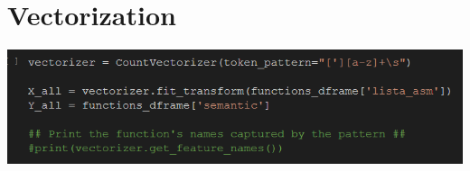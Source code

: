 \documentclass[11pt]{scrartcl}
\begin{document}
\newpage
\section{Vectorization}

\vspace{0.4cm}
\hspace{+0.2in}\includegraphics[width=1.0\textwidth]{vectorization.png}
\vspace{0.3cm}

\hspace{-0.2in}\noindent
\end{document}
